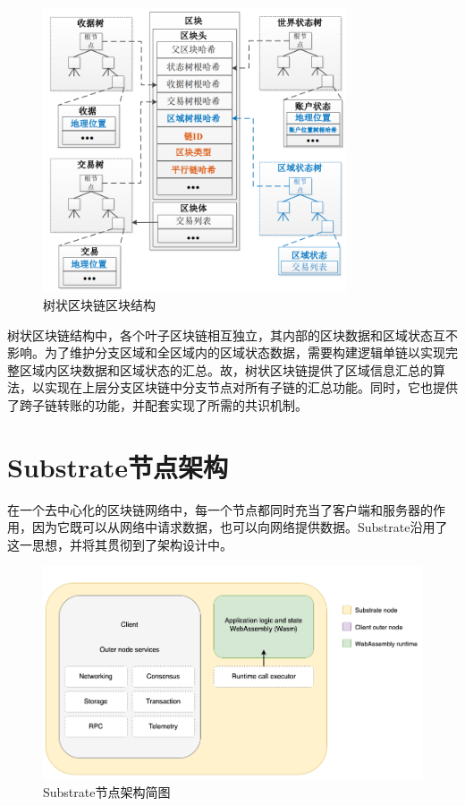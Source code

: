 \begin{figure}[htbp]
    \centering
    \includegraphics[width=0.8\textwidth]{images/树状区块链区块结构.png}
    \caption{树状区块链区块结构}\label{树状链区块结构示意图} %
\end{figure}

树状区块链结构中，各个叶子区块链相互独立，其内部的区块数据和区域状态互不影响。为了维护分支区域和全区域内的区域状态数据，需要构建逻辑单链以实现完整区域内区块数据和区域状态的汇总。故，树状区块链提供了区域信息汇总的算法，以实现在上层分支区块链中分支节点对所有子链的汇总功能。同时，它也提供了跨子链转账的功能，并配套实现了所需的共识机制。


\section{Substrate节点架构}

在一个去中心化的区块链网络中，每一个节点都同时充当了客户端和服务器的作用，因为它既可以从网络中请求数据，也可以向网络提供数据。Substrate沿用了这一思想，并将其贯彻到了架构设计中。

\begin{figure}[htbp]
    \centering
    \includegraphics[width=\textwidth]{images/simplified-architecture.png}
    \caption{Substrate节点架构简图}\label{Substrate节点架构简图} %
\end{figure}

